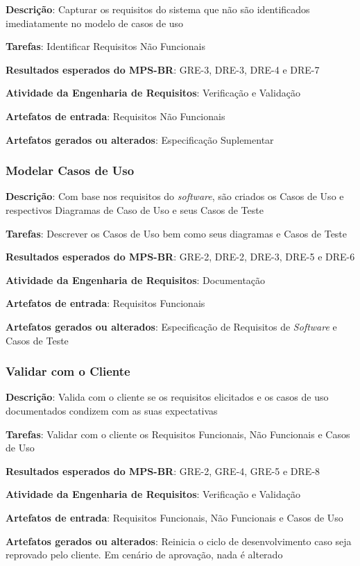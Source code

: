 \begin{description}
\item\textbf{Descrição}: Capturar os requisitos do sistema que não são identificados imediatamente no modelo de casos de uso
\item\textbf{Tarefas}: Identificar Requisitos Não Funcionais
\item\textbf{Resultados esperados do MPS-BR}: GRE-3, DRE-3, DRE-4 e DRE-7
\item\textbf{Atividade da Engenharia de Requisitos}: Verificação e Validação
\item\textbf{Artefatos de entrada}: Requisitos Não Funcionais
\item\textbf{Artefatos gerados ou alterados}: Especificação Suplementar
\end{description}

\subsubsection{Modelar Casos de Uso}

\begin{description}
\item\textbf{Descrição}: Com base nos requisitos do \textit{software}, são criados os Casos de Uso e respectivos Diagramas de Caso de Uso e seus Casos de Teste
\item\textbf{Tarefas}: Descrever os Casos de Uso bem como seus diagramas e Casos de Teste
\item\textbf{Resultados esperados do MPS-BR}: GRE-2, DRE-2, DRE-3, DRE-5 e DRE-6
\item\textbf{Atividade da Engenharia de Requisitos}: Documentação
\item\textbf{Artefatos de entrada}: Requisitos Funcionais
\item\textbf{Artefatos gerados ou alterados}: Especificação de Requisitos de \textit{Software} e Casos de Teste
\end{description}

\subsubsection{Validar com o Cliente}

\begin{description}
\item\textbf{Descrição}: Valida com o cliente se os requisitos elicitados e os casos de uso documentados condizem com as suas expectativas
\item\textbf{Tarefas}: Validar com o cliente os Requisitos Funcionais, Não Funcionais e Casos de Uso
\item\textbf{Resultados esperados do MPS-BR}: GRE-2, GRE-4, GRE-5 e DRE-8
\item\textbf{Atividade da Engenharia de Requisitos}: Verificação e Validação
\item\textbf{Artefatos de entrada}: Requisitos Funcionais, Não Funcionais e Casos de Uso
\item\textbf{Artefatos gerados ou alterados}: Reinicia o ciclo de desenvolvimento caso seja reprovado pelo cliente. Em cenário de aprovação, nada é alterado
\end{description}

